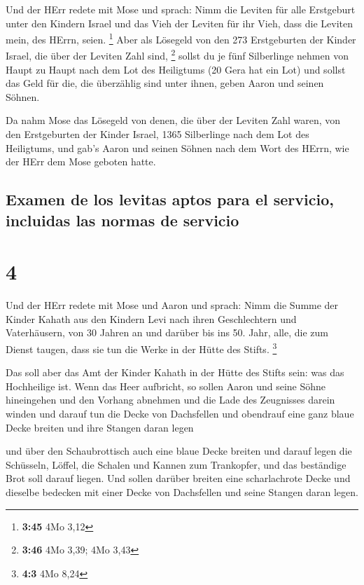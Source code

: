  Und der HErr redete mit Mose und sprach: 
Nimm die Leviten für alle Erstgeburt unter den Kindern Israel und das
Vieh der Leviten für ihr Vieh, dass die Leviten mein, des HErrn, seien.
\footnote{\textbf{3:45} 4Mo 3,12}  Aber als Lösegeld von
den 273 Erstgeburten der Kinder Israel, die über der Leviten Zahl sind,
\footnote{\textbf{3:46} 4Mo 3,39; 4Mo 3,43}  sollst du je
fünf Silberlinge nehmen von Haupt zu Haupt nach dem Lot des Heiligtums
(20 Gera hat ein Lot)  und sollst das Geld für die, die
überzählig sind unter ihnen, geben Aaron und seinen Söhnen.

 Da nahm Mose das Lösegeld von denen, die über der
Leviten Zahl waren,  von den Erstgeburten der Kinder
Israel, 1365 Silberlinge nach dem Lot des Heiligtums, 
und gab's Aaron und seinen Söhnen nach dem Wort des HErrn, wie der HErr
dem Mose geboten hatte.

\hypertarget{examen-de-los-levitas-aptos-para-el-servicio-incluidas-las-normas-de-servicio}{%
\subsection{Examen de los levitas aptos para el servicio, incluidas las
normas de
servicio}\label{examen-de-los-levitas-aptos-para-el-servicio-incluidas-las-normas-de-servicio}}

\hypertarget{section-3}{%
\section{4}\label{section-3}}

 Und der HErr redete mit Mose und Aaron und sprach:
 Nimm die Summe der Kinder Kahath aus den Kindern Levi
nach ihren Geschlechtern und Vaterhäusern,  von 30 Jahren
an und darüber bis ins 50. Jahr, alle, die zum Dienst taugen, dass sie
tun die Werke in der Hütte des Stifts. \footnote{\textbf{4:3} 4Mo 8,24}

 Das soll aber das Amt der Kinder Kahath in der Hütte des
Stifts sein: was das Hochheilige ist.  Wenn das Heer
aufbricht, so sollen Aaron und seine Söhne hineingehen und den Vorhang
abnehmen und die Lade des Zeugnisses darein winden  und
darauf tun die Decke von Dachsfellen und obendrauf eine ganz blaue Decke
breiten und ihre Stangen daran legen

 und über den Schaubrottisch auch eine blaue Decke breiten
und darauf legen die Schüsseln, Löffel, die Schalen und Kannen zum
Trankopfer, und das beständige Brot soll darauf liegen. 
Und sollen darüber breiten eine scharlachrote Decke und dieselbe
bedecken mit einer Decke von Dachsfellen und seine Stangen daran legen.


